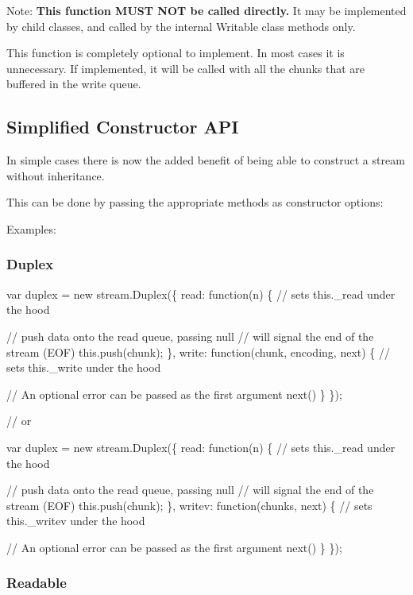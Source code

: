 Note\+: {\bfseries This function M\+U\+ST N\+OT be called directly.} It may be implemented by child classes, and called by the internal Writable class methods only.

This function is completely optional to implement. In most cases it is unnecessary. If implemented, it will be called with all the chunks that are buffered in the write queue.

\subsection*{Simplified Constructor A\+PI}

In simple cases there is now the added benefit of being able to construct a stream without inheritance.

This can be done by passing the appropriate methods as constructor options\+:

Examples\+:

\subsubsection*{Duplex}


\begin{DoxyCode}
var duplex = new stream.Duplex(\{
  read: function(n) \{
    // sets this.\_read under the hood

    // push data onto the read queue, passing null
    // will signal the end of the stream (EOF)
    this.push(chunk);
  \},
  write: function(chunk, encoding, next) \{
    // sets this.\_write under the hood

    // An optional error can be passed as the first argument
    next()
  \}
\});

// or

var duplex = new stream.Duplex(\{
  read: function(n) \{
    // sets this.\_read under the hood

    // push data onto the read queue, passing null
    // will signal the end of the stream (EOF)
    this.push(chunk);
  \},
  writev: function(chunks, next) \{
    // sets this.\_writev under the hood

    // An optional error can be passed as the first argument
    next()
  \}
\});
\end{DoxyCode}


\subsubsection*{Readable}



